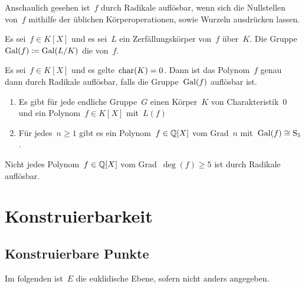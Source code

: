 Anschaulich gesehen ist~$f$ durch Radikale auflösbar, wenn sich die Nullstellen von~$f$ mithilfe der üblichen Körperoperationen, sowie Wurzeln ausdrücken lassen. 

\begin{definition}
  Es sei~$f \in K[X]$ und es sei~$L$ ein Zerfällungskörper von~$f$ über~$K$.
  Die Gruppe~$\operatorname{Gal}(f) \coloneqq \operatorname{Gal}(L/K)$ die  von~$f$.
\end{definition}

\begin{theorem}
  Es sei~$f \in K[X]$ und es gelte~$\operatorname{char}(K) = 0$.
  Dann ist das Polynom~$f$ genau dann durch Radikale auflösbar, falls die Gruppe~$\operatorname{Gal}(f)$ auflösbar ist.
\end{theorem}

\begin{lemma}
  \leavevmode
  \begin{enumerate}
    \item
      Es gibt für jede endliche Gruppe~$G$ einen Körper~$K$ von Charakteristik~$0$ und ein Polynom~$f \in K[X]$ mit~$L(f)$
    \item
      Für jedes~$n \geq 1$ gibt es ein Polynom~$f \in \mathbb{Q}[X]$ vom Grad~$n$ mit~$\operatorname{Gal}(f) \cong \operatorname{S}_5$.
  \end{enumerate}
\end{lemma}

\begin{theorem}
  Nicht jedes Polynom~$f \in \mathbb{Q}[X]$ vom Grad~$\deg(f) \geq 5$ ist durch Radikale auflösbar.
\end{theorem}





\section{Konstruierbarkeit}



\subsection{Konstruierbare Punkte}

\begin{convention}
  Im folgenden ist~$E$ die euklidische Ebene, sofern nicht anders angegeben.
\end{convention}

